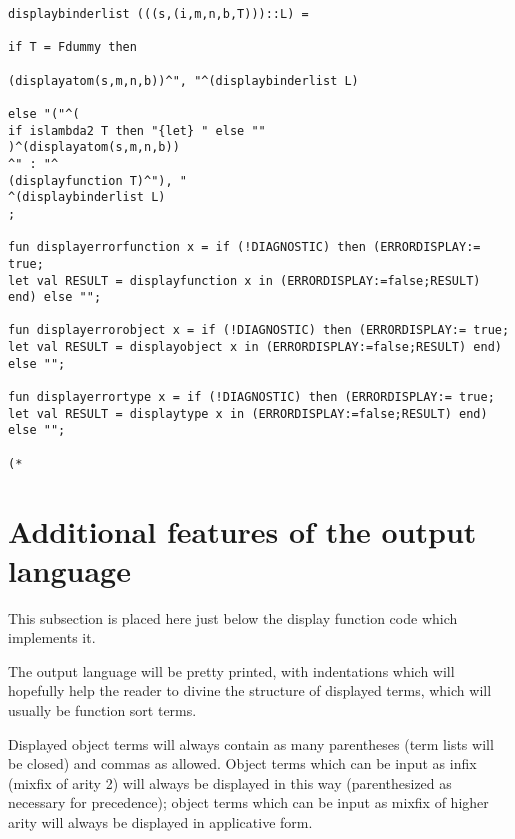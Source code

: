 \documentclass[12pt]{article}
\begin{document}
\begin{verbatim}
displaybinderlist (((s,(i,m,n,b,T)))::L) = 

if T = Fdummy then

(displayatom(s,m,n,b))^", "^(displaybinderlist L)

else "("^(
if islambda2 T then "{let} " else ""
)^(displayatom(s,m,n,b))
^" : "^
(displayfunction T)^"), "
^(displaybinderlist L)
;

fun displayerrorfunction x = if (!DIAGNOSTIC) then (ERRORDISPLAY:= true; 
let val RESULT = displayfunction x in (ERRORDISPLAY:=false;RESULT) end) else "";

fun displayerrorobject x = if (!DIAGNOSTIC) then (ERRORDISPLAY:= true; 
let val RESULT = displayobject x in (ERRORDISPLAY:=false;RESULT) end) else "";

fun displayerrortype x = if (!DIAGNOSTIC) then (ERRORDISPLAY:= true; 
let val RESULT = displaytype x in (ERRORDISPLAY:=false;RESULT) end) else "";

(*

\end{verbatim}

\newpage

\section{Additional features of the output language}

This subsection is placed here just below the display function code which implements it.

The output language will be pretty printed, with indentations which will hopefully help the reader to divine the structure of displayed terms, which will usually
be function sort terms.

Displayed object terms will always contain as many parentheses (term lists will be closed) and commas as allowed.  Object terms which can be input as infix (mixfix of arity 2) will always be displayed in this way (parenthesized as necessary for precedence);  object terms which can be input as mixfix of higher arity will always be displayed in applicative form.
\end{document}
